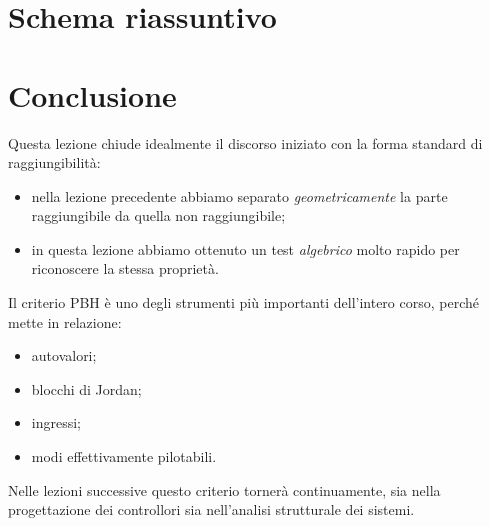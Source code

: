 \section{Schema riassuntivo}

\begin{center}
\end{center}

\section{Conclusione}

Questa lezione chiude idealmente il discorso iniziato con la forma standard di raggiungibilità:
\begin{itemize}
    \item nella lezione precedente abbiamo separato \emph{geometricamente} la parte raggiungibile da quella non raggiungibile;
    \item in questa lezione abbiamo ottenuto un test \emph{algebrico} molto rapido per riconoscere la stessa proprietà.
\end{itemize}

Il criterio PBH è uno degli strumenti più importanti dell’intero corso, perché mette in relazione:
\begin{itemize}
    \item autovalori;
    \item blocchi di Jordan;
    \item ingressi;
    \item modi effettivamente pilotabili.
\end{itemize}

Nelle lezioni successive questo criterio tornerà continuamente, sia nella progettazione dei controllori sia nell’analisi strutturale dei sistemi.